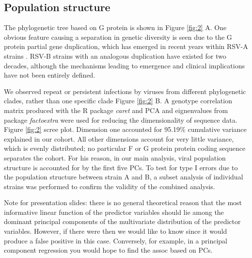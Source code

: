 \documentclass{article}
\begin{document}
\subsection{Population structure}
The phylogenetic tree based on G protein is shown in 
Figure \ref{fig:2} A.
One obvious feature causing a separation in genetic diversity is seen due to the G protein partial gene duplication, 
which has emerged in recent years within RSV-A strains 
\cite{eshaghi2012genetic}.
RSV-B strains with an analogous duplication have existed for two decades, 
although the mechanisms leading to emergence and clinical implications have not been entirely defined.

We observed repeat or persistent infections by viruses from different phylogenetic clades, rather than one specific clade 
Figure \ref{fig:2} B.
A genotype correlation matrix produced with the R package \textit{caret} and PCA and eignenvalues from package \textit{factoextra} were used for reducing the dimensionality of sequence data.
Figure \ref{fig:2} scree plot.
Dimension one accounted for 95.19\% cumulative variance explained in our cohort.
All other dimensions account for very little variance, which is evenly distributed; no particular F or G protein protein coding sequence separates the cohort.
For his reason, in our main analysis, viral population structure is accounted for by the first five PCs. 
To test for type I errors due to the population structure between strain A and B, 
a subset analysis of individual strains was performed to confirm the validity of the combined analysis.

Note for presentation slides: there is no general theoretical reason that the most informative linear function of the predictor variables should lie among the dominant principal components of the multivariate distribution of the predictor variables. However, if there were then we would like to know since it would produce a false positive in this case. Conversely, for example, in a principal component regression you would hope to find the assoc based on PCs.
\end{document}
